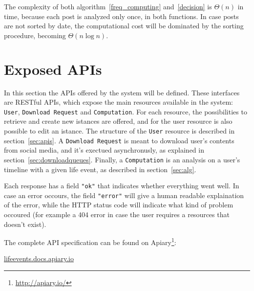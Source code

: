 The complexity of both algorithm~\ref{freq_computing} and~\ref{decision} is $\Theta(n)$ in time, because each post is analyzed only once, in both functions. In case posts are not sorted by date, the computational cost will be dominated by the sorting procedure, becoming $\Theta(n \log n)$.

\section{Exposed APIs}
\label{sec:APIs}

In this section the APIs offered by the system will be defined. These interfaces are RESTful APIs, which expose the main resources available in the system: \texttt{User}, \texttt{Download Request} and \texttt{Computation}. For each resource, the possibilities to retrieve and create new istances are offered, and for the user resource is also possible to edit an istance. The structure of the \texttt{User} resource is described in section~\ref{sec:apis}. A \texttt{Download Request} is meant to download user's contents from social media, and it's exectued asynchronusly, as explained in section~\ref{sec:downloadqueues}. Finally, a \texttt{Computation} is an analysis on a user's timeline with a given life event, as described in section~\ref{sec:alg}.

Each response has a field \texttt{"ok"} that indicates whether everything went well. In case an error occours, the field \texttt{"error"} will give a human readable explaination of the error, while the HTTP status code will indicate what kind of problem occoured (for example a 404 error in case the user requires a resources that doesn't exist).

The complete API specification can be found on Apiary\footnote{\url{http://apiary.io/}}:
\begin{center}
\url{lifeevents.docs.apiary.io}
\end{center}

